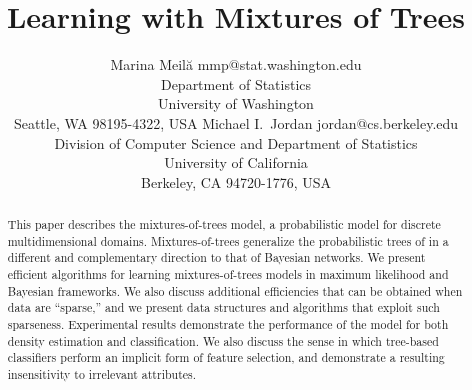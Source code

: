%

\usepackage{jmlr2e}


\newcommand{\dataset}{{\cal D}}
\newcommand{\fracpartial}[2]{\frac{\partial #1}{\partial  #2}}






	
	\title{Learning with Mixtures of Trees}
	
	\author{\name Marina Meil\u{a} \email mmp@stat.washington.edu \\
		\addr Department of Statistics\\
		University of Washington\\
		Seattle, WA 98195-4322, USA
		\AND
		\name Michael I.\ Jordan \email jordan@cs.berkeley.edu \\
		\addr Division of Computer Science and Department of Statistics\\
		University of California\\
		Berkeley, CA 94720-1776, USA}
	
	
	\maketitle
	
	\begin{abstract}%
		This paper describes the mixtures-of-trees model, a probabilistic 
		model for discrete multidimensional domains.  Mixtures-of-trees 
		generalize the probabilistic trees of \citet{chow:68}
		in a different and complementary direction to that of Bayesian networks.
		We present efficient algorithms for learning mixtures-of-trees 
		models in maximum likelihood and Bayesian frameworks. 
		We also discuss additional efficiencies that can be
		obtained when data are ``sparse,'' and we present data 
		structures and algorithms that exploit such sparseness.
		Experimental results demonstrate the performance of the 
		model for both density estimation and classification. 
		We also discuss the sense in which tree-based classifiers
		perform an implicit form of feature selection, and demonstrate
		a resulting insensitivity to irrelevant attributes.
	\end{abstract}
	
